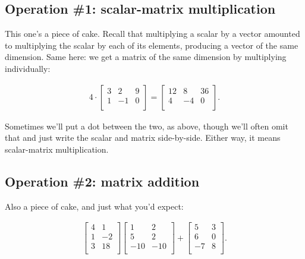 \subsection{Operation \#1: scalar-matrix multiplication}
\label{scalarMatrixMultiplication}

This one's a piece of cake. Recall that multiplying a scalar by a vector
amounted to multiplying the scalar by each of its elements, producing a vector
of the same dimension. Same here: we get a matrix of the same dimension by
multiplying individually:

\vspace{-.15in}
\begin{align*}
4 \cdot
\begin{bmatrix}
3 & 2 & 9 \\
1 & -1 & 0 \\
\end{bmatrix}
=
\begin{bmatrix}
12 & 8 & 36 \\
4 & -4 & 0 \\
\end{bmatrix}.
\end{align*}
\vspace{-.15in}

Sometimes we'll put a dot between the two, as above, though we'll often omit
that and just write the scalar and matrix side-by-side. Either way, it means
scalar-matrix multiplication.

\subsection{Operation \#2: matrix addition}

Also a piece of cake, and just what you'd expect:

\vspace{-.15in}
\begin{align*}
\begin{bmatrix}
4 & 1 \\
1 & -2 \\
3 & 18 \\
\end{bmatrix}
\begin{bmatrix}
1 & 2 \\
5 & 2 \\
-10 & -10 \\
\end{bmatrix}
+
\begin{bmatrix}
5 & 3 \\
6 & 0 \\
-7 & 8 \\
\end{bmatrix}.
\end{align*}
\vspace{-.15in}

